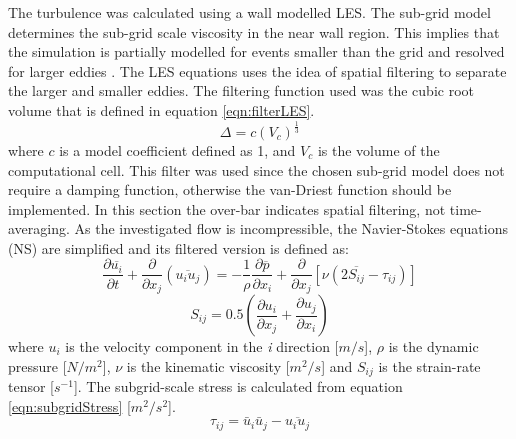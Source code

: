 \documentclass[../main.tex]{subfiles}
\begin{document}
The turbulence was calculated using a wall modelled LES. The sub-grid model determines the sub-grid scale viscosity in the near wall region. This implies that the simulation is partially modelled for events smaller than the grid and resolved for larger eddies \cite{versteeg2007}. The LES equations uses the idea of spatial filtering to separate the larger and smaller eddies. The filtering function used was the cubic root volume that is defined in equation \ref{eqn:filterLES}.
\begin{equation}
\Delta = c \left( V_c \right)^{\frac{1}{3}}
\label{eqn:filterLES}
\end{equation}
where $c$ is a model coefficient defined as 1, and $V_c$ is the volume of the computational cell. This filter was used since the chosen sub-grid model does not require a damping function, otherwise the van-Driest function should be implemented.
In this section the over-bar indicates spatial filtering, not time-averaging. As the investigated flow is incompressible, the Navier-Stokes equations (NS) are simplified and its filtered version is defined as:
\begin{equation}
\frac{\partial \overline{u_i}}{\partial t}+\frac{\partial }{\partial x_j} \left ( \overline{u_i u_j} \right )= -\frac{1}{\rho}\frac{\partial \overline{p}}{\partial x_i}+\frac{\partial }{\partial x_j} \left [ \nu \left ( 2 \overline{S_{ij}}-\tau_{ij} \right ) \right ]
\label{eqn:LESfiltered}
\end{equation}\begin{equation}
S_{ij}=0.5\left ( \frac{\partial u_i}{\partial x_j}+\frac{\partial u_j}{\partial x_i} \right )
\label{eqn:strainRateTensor}
\end{equation}
where $u_i$ is the velocity component in the \textit{i} direction [$m/s$], $\rho$ is the dynamic pressure [$N/m^2$], $\nu$ is the kinematic viscosity [$m^2/s$] and $S_{ij}$ is the strain-rate tensor [$s^{-1}$]. The subgrid-scale stress is calculated from equation \ref{eqn:subgridStress} [$m^2/s^2$].
\begin{equation}
\tau_{ij}=\bar{u}_i \bar{u}_j-\overline{u_i u_j}
\label{eqn:subgridStress}
\end{equation}
\end{document}
